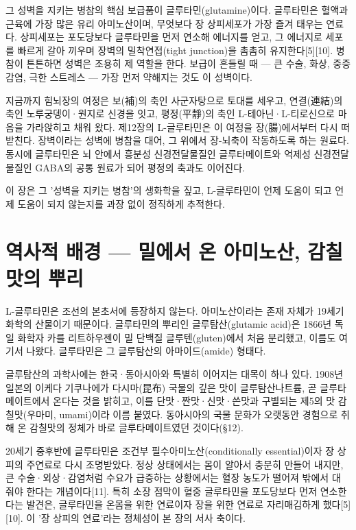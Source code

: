 \documentclass[12pt,oneside]{book}
\begin{document}
그 성벽을 지키는 병참의 핵심 보급품이 글루타민(glutamine)이다. 글루타민은 혈액과 근육에 가장 많은 유리 아미노산이며, 무엇보다 장 상피세포가 가장 즐겨 태우는 연료다. 상피세포는 포도당보다 글루타민을 먼저 연소해 에너지를 얻고, 그 에너지로 세포를 빠르게 갈아 끼우며 장벽의 밀착연접(tight junction)을 촘촘히 유지한다[5][10]. 병참이 튼튼하면 성벽은 조용히 제 역할을 한다. 보급이 흔들릴 때 — 큰 수술, 화상, 중증 감염, 극한 스트레스 — 가장 먼저 약해지는 것도 이 성벽이다.

지금까지 힘뇌장의 여정은 보(補)의 축인 사군자탕으로 토대를 세우고, 연결(連結)의 축인 노루궁뎅이·원지로 신경을 잇고, 평정(平靜)의 축인 L-테아닌·L-티로신으로 마음을 가라앉히고 채워 왔다. 제12장의 L-글루타민은 이 여정을 장(腸)에서부터 다시 떠받친다. 장벽이라는 성벽에 병참을 대어, 그 위에서 장-뇌축이 작동하도록 하는 원료다. 동시에 글루타민은 뇌 안에서 흥분성 신경전달물질인 글루타메이트와 억제성 신경전달물질인 GABA의 공통 원료가 되어 평정의 축과도 이어진다.

이 장은 그 '성벽을 지키는 병참'의 생화학을 짚고, L-글루타민이 언제 도움이 되고 언제 도움이 되지 않는지를 과장 없이 정직하게 추적한다.

\section{역사적 배경 — 밀에서 온 아미노산, 감칠맛의 뿌리}

L-글루타민은 조선의 본초서에 등장하지 않는다. 아미노산이라는 존재 자체가 19세기 화학의 산물이기 때문이다. 글루타민의 뿌리인 글루탐산(glutamic acid)은 1866년 독일 화학자 카를 리트하우젠이 밀 단백질 글루텐(gluten)에서 처음 분리했고, 이름도 여기서 나왔다. 글루타민은 그 글루탐산의 아마이드(amide) 형태다.

글루탐산의 과학사에는 한국·동아시아와 특별히 이어지는 대목이 하나 있다. 1908년 일본의 이케다 기쿠나에가 다시마(昆布) 국물의 깊은 맛이 글루탐산나트륨, 곧 글루타메이트에서 온다는 것을 밝히고, 이를 단맛·짠맛·신맛·쓴맛과 구별되는 제5의 맛 감칠맛(우마미, umami)이라 이름 붙였다. 동아시아의 국물 문화가 오랫동안 경험으로 취해 온 감칠맛의 정체가 바로 글루타메이트였던 것이다(§12).

20세기 중후반에 글루타민은 조건부 필수아미노산(conditionally essential)이자 장 상피의 주연료로 다시 조명받았다. 정상 상태에서는 몸이 알아서 충분히 만들어 내지만, 큰 수술·외상·감염처럼 수요가 급증하는 상황에서는 혈장 농도가 떨어져 밖에서 대 줘야 한다는 개념이다[11]. 특히 소장 점막이 혈중 글루타민을 포도당보다 먼저 연소한다는 발견은, 글루타민을 온몸을 위한 연료이자 장을 위한 연료로 자리매김하게 했다[5][10]. 이 '장 상피의 연료'라는 정체성이 본 장의 서사 축이다.
\end{document}

